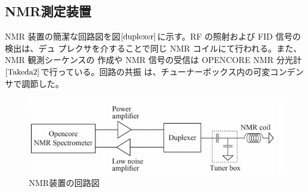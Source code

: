  \subsection{NMR測定装置}
 NMR 装置の簡潔な回路図を図$\ref{duplexer}$に示す。RF の照射および FID 信号の検出は、デュ
 プレクサを介することで同じ NMR コイルにて行われる。また、NMR 観測シーケンスの
 作成や NMR 信号の受信は OPENCORE NMR 分光計$\cite{Takeda2} $で行っている。回路の共振
 は、チューナーボックス内の可変コンデンサで調節した。

\begin{figure}[ht]
  \centering
  \includegraphics[keepaspectratio, scale=1.0]
       {./chap2/fig/duplexer.png}
  \caption{NMR装置の回路図}
  \label{duplexer}
 \end{figure}


